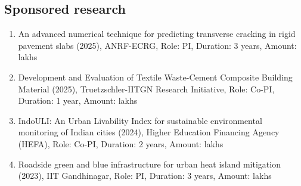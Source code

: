 \documentclass[12pt]{article}
\begin{document}
\subsection*{Sponsored research}
\begin{enumerate}
	\item An advanced numerical technique for predicting transverse cracking in rigid pavement slabs (2025), ANRF-ECRG, Role: PI, Duration: 3 years, Amount:  lakhs
	\item Development and Evaluation of Textile Waste-Cement Composite Building Material (2025), Truetzschler-IITGN Research Initiative, Role: Co-PI, Duration: 1 year, Amount:  lakhs
	\item IndoULI: An Urban Livability Index for sustainable environmental monitoring of Indian cities (2024), Higher Education Financing Agency (HEFA), Role: Co-PI, Duration: 2 years, Amount:  lakhs
	\item Roadside green and blue infrastructure for urban heat island mitigation (2023), IIT Gandhinagar, Role: PI, Duration: 3 years, Amount:  lakhs
\end{enumerate}

\hfill
\end{document}
